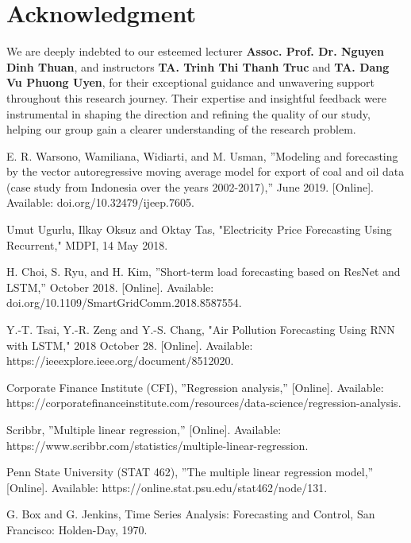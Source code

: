 \documentclass{ieeeojies}
\begin{document}
\section*{Acknowledgment}
We are deeply indebted to our esteemed lecturer \textbf{Assoc. Prof. Dr. Nguyen Dinh Thuan}, and instructors \textbf{TA. Trinh Thi Thanh Truc} and \textbf{TA. Dang Vu Phuong Uyen}, for their exceptional guidance and unwavering support throughout this research journey. Their expertise and insightful feedback were instrumental in shaping the direction and refining the quality of our study, helping our group gain a clearer understanding of the research problem.

\begin{thebibliography}{100}

 E. R. Warsono, Wamiliana, Widiarti, and M. Usman, ''Modeling and forecasting by the vector autoregressive moving average model for export of coal and oil data (case study from Indonesia over the years 2002-2017),'' June 2019. [Online]. Available: doi.org/10.32479/ijeep.7605.

 Umut Ugurlu, Ilkay Oksuz and Oktay Tas, "Electricity Price Forecasting Using Recurrent," MDPI, 14 May 2018.

 H. Choi, S. Ryu, and H. Kim, ''Short-term load forecasting based on ResNet and LSTM,'' October 2018. [Online]. Available: doi.org/10.1109/SmartGridComm.2018.8587554.

 Y.-T. Tsai, Y.-R. Zeng and Y.-S. Chang, "Air Pollution Forecasting Using RNN with LSTM," 2018 October 28. [Online]. Available: https://ieeexplore.ieee.org/document/8512020.

 Corporate Finance Institute (CFI), ''Regression analysis,'' [Online]. Available: https://corporatefinanceinstitute.com/resources/data-science/regression-analysis.

 Scribbr, ''Multiple linear regression,'' [Online]. Available: https://www.scribbr.com/statistics/multiple-linear-regression.

 Penn State University (STAT 462), ''The multiple linear regression model,'' [Online]. Available: https://online.stat.psu.edu/stat462/node/131.

G. Box and G. Jenkins, Time Series Analysis: Forecasting and Control, San Francisco: Holden-Day, 1970. 


\end{thebibliography}
\end{document}
